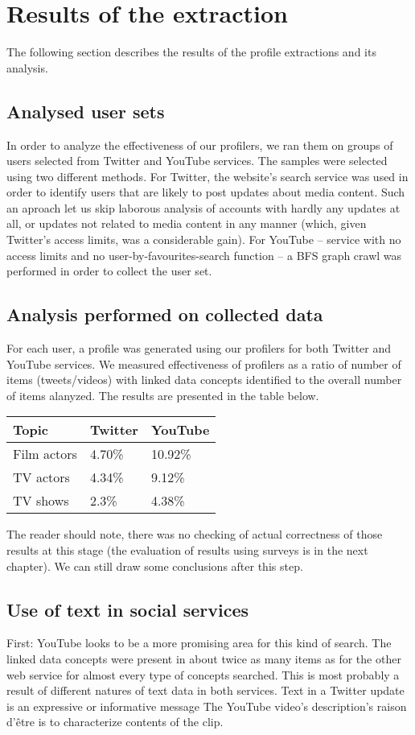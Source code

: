 \section{Results of the extraction}

The following section describes the results of the profile extractions and its
analysis.

\subsection{Analysed user sets}
In order to analyze the effectiveness of our profilers, we ran them on groups of
users selected from Twitter and YouTube services. The samples were selected
using two different methods. For Twitter, the website's search service was used
in order to identify users that are likely to post updates about media content.
Such an aproach let us skip laborous analysis of accounts with hardly any
updates at all, or updates not related to media content in any manner (which,
given Twitter's access limits, was a considerable gain). For YouTube -- service
with no access limits and no user-by-favourites-search function -- a BFS graph
crawl was performed in order to collect the user set.

\subsection{Analysis performed on collected data}

For each user, a profile was generated using our profilers for both Twitter and
YouTube services. We measured effectiveness of profilers as a ratio of number of
items (tweets/videos) with linked data concepts identified to the overall number
of items alanyzed. The results are presented in the table below.


\begin{tabular}{| l | l | l |}
Topic & Twitter & YouTube \\ \hline
Film actors & 4.70\% & 10.92\% \\
TV actors & 4.34\% & 9.12\% \\
TV shows & 2.3\% & 4.38\% \\
\end{tabular}


The reader should note, there was no checking of actual correctness of those results at
this stage (the evaluation of results using surveys is in the next chapter). We
can still draw some conclusions after this step.

\subsection{Use of text in social services}
First: YouTube looks to be a more promising area for this kind of search. The
linked data concepts were present in about twice as many items as for the other
web service for almost every type of concepts searched. This is most probably a
result of different natures of text data in both services.  Text in a Twitter
update is an expressive or informative message The YouTube video's description's
raison d'être is to characterize contents of the clip.

